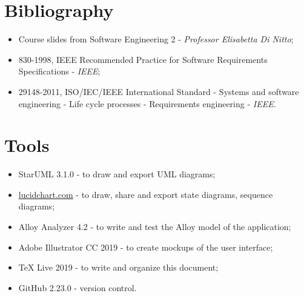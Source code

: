 \documentclass[12pt,a4paper]{report}
\begin{document}
	\section{Bibliography}
	\begin{itemize}
	\item Course slides from Software Engineering 2 - \emph{Professor Elisabetta Di Nitto};
	\item 830-1998, IEEE Recommended Practice for Software Requirements Specifications - \emph{IEEE};
	\item 29148-2011, ISO/IEC/IEEE International Standard - Systems and software engineering - Life cycle processes - Requirements engineering - \emph{IEEE}.
	\end{itemize}

	\section{Tools}
	\begin{itemize}
	\item StarUML 3.1.0 - to draw and export UML diagrams;
	\item \url{lucidchart.com} - to draw, share and export state diagrams, sequence diagrams;
	\item Alloy Analyzer 4.2 - to write and test the Alloy model of the application;
	\item Adobe Illustrator CC 2019 - to create mockups of the user interface;
	\item TeX Live 2019 - to write and organize this document;
	\item GitHub 2.23.0 - version control.
	\end{itemize}

\end{document}
